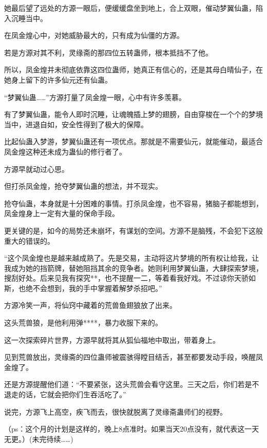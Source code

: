\begin{this_body}
她最后望了远处的方源一眼后，便缓缓盘坐到地上，合上双眼，催动梦翼仙蛊，陷入沉睡当中。

在凤金煌心中，对她威胁最大的，只有成为仙僵的方源。

若是方源对其不利，灵缘斋的那四位五转蛊师，根本抵挡不了他。

所以，凤金煌并未彻底依靠这四位蛊师，她真正有信心的，还是其母白晴仙子，在她身上留下的许多仙元还有仙蛊。

“梦翼仙蛊……”方源打量了凤金煌一眼，心中有许多羡慕。

有了梦翼仙蛊，能令人即时沉睡，让魂魄插上梦的翅膀，自由穿梭在一个个的梦境当中，进退自如，安全性得到了极大的保障。

比起仙蛊入梦游，梦翼仙蛊还有一项优点。那就是不需要仙元，就能催动，最适合凤金煌这种还未成为蛊仙的修行者了。

方源早就动过心思。

但打杀凤金煌，抢夺梦翼仙蛊的想法，并不现实。

抢夺仙蛊，本身就是十分困难的事情。打杀凤金煌，也不容易，猪脑子都能想到，凤金煌身上一定有大量的保命手段。

更关键的是，如今的局势还未崩坏，有谋划的空间。方源不是脑残，不会犯下这般重大的错误的。

“这个凤金煌也是越来越成熟了。先是交易，主动将这片梦境的所有权让给我，让我成为她的挡箭牌，替她阻挡其余的竞争者。她则利用梦翼仙蛊，大肆探索梦境，搜刮好处。后来见我有探究**，也不提醒一二，等着看我好戏。不过谅你天骄如斯，也绝不会想到，我的手中掌握着解梦杀招吧。”

方源冷笑一声，将仙窍中藏着的荒兽鱼翅狼放了出来。

这头荒兽狼，是他利用弹****，暴力收服下来的。

这一次探索碎片世界，方源早就将其从狐仙福地中取出，带着身上。

见到荒兽放出，灵缘斋的四位蛊师被震骇得瞠目结舌，甚至都要发动手段，唤醒凤金煌了。

还是方源提醒他们道：“不要紧张，这头荒兽会看守这里。三天之后，你们若是不退走的话，它就会把你们生吞活吃了。”

说完，方源飞上高空，疾飞而去，很快就脱离了灵缘斋蛊师们的视野。

（ps：这个月的计划是这样的，晚上8点准时。如果当天20点没有，就代表这一天无更。）(未完待续……)

\end{this_body}

